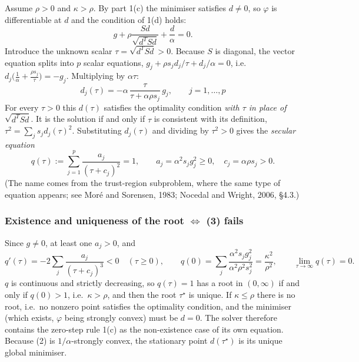 \documentclass[11pt,a4paper]{article}
\begin{document}
Assume $\rho>0$ and $\kappa>\rho$. By part 1(c) the minimiser satisfies $d\neq0$, so
$\varphi$ is differentiable at $d$ and the condition of 1(d) holds:
\begin{equation*}
g+\rho\frac{Sd}{\sqrt{d^TSd}}+\frac d\alpha=0 .
\end{equation*}
Introduce the unknown scalar $\tau=\sqrt{d^TSd}>0$. Because $S$ is diagonal, the
vector equation splits into $p$ scalar equations,
$g_j+\rho s_jd_j/\tau+d_j/\alpha=0$, i.e.\
$d_j\big(\tfrac1\alpha+\tfrac{\rho s_j}{\tau}\big)=-g_j$. Multiplying by $\alpha\tau$:
\begin{equation*}
\boxed{\;d_j(\tau)=-\alpha\,\frac{\tau}{\tau+\alpha\rho s_j}\,g_j,\qquad j=1,\dots,p\;}
\end{equation*}
For every $\tau>0$ this $d(\tau)$ satisfies the optimality condition \emph{with
$\tau$ in place of $\sqrt{d^TSd}$}. It is the solution if and only if $\tau$ is
consistent with its definition, $\tau^2=\sum_js_jd_j(\tau)^2$. Substituting
$d_j(\tau)$ and dividing by $\tau^2>0$ gives the \emph{secular equation}
\begin{equation*}
q(\tau):=\sum_{j=1}^p\frac{a_j}{(\tau+c_j)^2}=1,\qquad
a_j=\alpha^2s_jg_j^2\ge0,\quad c_j=\alpha\rho s_j>0 .
\end{equation*}
(The name comes from the trust-region subproblem, where the same type of equation
appears; see Moré and Sorensen, 1983; Nocedal and Wright, 2006, §4.3.)

\subsubsection*{Existence and uniqueness of the root $\Longleftrightarrow$ (3) fails}

Since $g\ne0$, at least one $a_j>0$, and
\begin{equation*}
q'(\tau)=-2\sum_j\frac{a_j}{(\tau+c_j)^3}<0\quad(\tau\ge0),\qquad
q(0)=\sum_j\frac{\alpha^2s_jg_j^2}{\alpha^2\rho^2s_j^2}=\frac{\kappa^2}{\rho^2},\qquad
\lim_{\tau\to\infty}q(\tau)=0 .
\end{equation*}
$q$ is continuous and strictly decreasing, so $q(\tau)=1$ has a root in $(0,\infty)$
if and only if $q(0)>1$, i.e.\ $\kappa>\rho$, and then the root $\tau^\star$ is
unique. If $\kappa\le\rho$ there is no root, i.e.\ no nonzero point satisfies the
optimality condition, and the minimiser (which exists, $\varphi$ being strongly convex)
must be $d=0$. The solver therefore contains the zero-step rule 1(c) as the
non-existence case of its own equation. Because (2) is $1/\alpha$-strongly convex,
the stationary point $d(\tau^\star)$ is its unique global minimiser.
\end{document}

